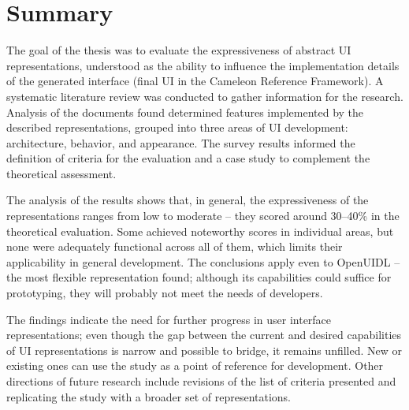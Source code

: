 \chapter{Summary}\label{ch:summary}

The goal of the thesis was to evaluate the expressiveness of abstract UI representations, understood as the ability to influence the implementation details of the generated interface (final UI in the Cameleon Reference Framework).
A systematic literature review was conducted to gather information for the research.
Analysis of the documents found determined features implemented by the described representations, grouped into three areas of UI development: architecture, behavior, and appearance.
The survey results informed the definition of criteria for the evaluation and a case study to complement the theoretical assessment.

The analysis of the results shows that, in general, the expressiveness of the representations ranges from low to moderate -- they scored around 30--40\% in the theoretical evaluation.
Some achieved noteworthy scores in individual areas, but none were adequately functional across all of them, which limits their applicability in general development.
The conclusions apply even to OpenUIDL -- the most flexible representation found; although its capabilities could suffice for prototyping, they will probably not meet the needs of developers.

The findings indicate the need for further progress in user interface representations;
even though the gap between the current and desired capabilities of UI representations is narrow and possible to bridge, it remains unfilled.
New or existing ones can use the study as a point of reference for development.
Other directions of future research include revisions of the list of criteria presented and replicating the study with a broader set of representations.
